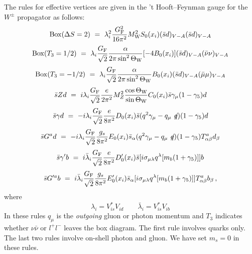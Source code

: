 \documentclass[12pt]{article}
\newcommand{\mw}{M_{\rm W}}
\newcommand{\be}{\begin{equation}}
\newcommand{\ee}{\end{equation}}
\begin{document}
\begin{itemize}
The rules for effective vertices are given  
in the 
't Hooft--Feynman gauge for the $W^\pm$ propagator as follows:
\begin{equation}\label{FR}
  {\rm Box} (\Delta S = 2)
~=~ \lambda^2_i {{G^2_{\rm F}}\over{16\pi^2}} \mw^2S_0(x_i) 
   (\bar s d)_{V-A} (\bar s d)_{V-A} 
\end{equation}
\begin{equation}\label{BT12}
 {\rm Box}(T_3= 1/2)~ =~ \lambda_i {{G_{\rm F}}\over{\sqrt 2}}
   {{\alpha}\over{2\pi \sin^2\Theta_{\rm W}}} \lbrack -4 B_0(x_i)\rbrack 
   (\bar s d)_{V-A} (\bar\nu\nu)_{V-A}
\end{equation}
\begin{equation}\label{BTM12}
{\rm Box}(T_3= -1/2)~ =~ \lambda_i {{G_{\rm F}}\over{\sqrt 2}}
   {{\alpha}\over{2\pi \sin^2\Theta_{\rm W}}} B_0(x_i) (\bar s d)_{V-A} 
   (\bar\mu\mu)_{V-A}
\end{equation}
\begin{equation}\label{ZRULE}
 \bar s Z d~ =~i \lambda_i {{G_{\rm F}}\over{\sqrt 2}} {{e}\over{2\pi^2}} 
M^2_Z
   {{\cos\Theta_{\rm W}}\over{\sin\Theta_{\rm W}}} C_0(x_i) \bar s \gamma_\mu 
   (1-\gamma_5)d
\end{equation}
\begin{equation}
 \bar s\gamma d~ =~- i\lambda_i {{G_{\rm F}}\over{\sqrt 2}} {{e}\over{8\pi^2}}
   D_0(x_i) \bar s (q^2\gamma_\mu - q_\mu \not\!q)(1-\gamma_5)d 
\end{equation}
\begin{equation}
 \bar s G^a d~ =~ -i\lambda_i{{G_{\rm F}}\over{\sqrt 
2}} {{g_s}\over{8\pi^2}}
   E_0(x_i) \bar s_{\alpha}(q^2\gamma_\mu - q_\mu \not\!q)
(1-\gamma_5)T^a_{\alpha\beta}d_\beta 
\end{equation}
\begin{equation}\label{MGP}
 \bar s \gamma' b~ =~i\bar\lambda_i {{G_{\rm F}}\over{\sqrt 2}} {{e}\over
   {8\pi^2}} D'_0(x_i) \bar s \lbrack i\sigma_{\mu\lambda} q^\lambda
   \lbrack m_b (1+\gamma_5) \rbrack\rbrack b
\end{equation}
\begin{equation}\label{FRF}
 \bar s G'^a b~ =~ 
i\bar\lambda_i{{G_{\rm F}}\over{\sqrt 2}}{{g_s}\over{8\pi^2}}
   E'_0(x_i)\bar s_{\alpha} \lbrack i\sigma_{\mu\lambda} q^\lambda
   \lbrack m_b (1+\gamma_5) \rbrack\rbrack T^a_{\alpha\beta} b_\beta \,,
\end{equation}
where 
\be
\lambda_i=V^*_{is}V_{id}\quad\quad \bar\lambda_i=V^*_{is}V_{ib}
\ee
In these rules
$q_\mu$ is the {\it outgoing} gluon or photon momentum
and $T_3$ indicates whether $\nu\bar\nu$ or $l^+l^-$
leaves the box diagram. The first rule involves quarks only.
The last two rules involve on-shell photon
and gluon.
We have set $m_s=0$ in these rules.


\end{itemize}
\end{document}
